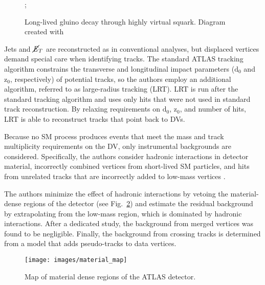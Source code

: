 \documentclass[12pt]{article}
\begin{document}
        \noindent \begin{figure}[htbp] \begin{center}
        ;
        \caption{Long-lived gluino decay through highly virtual squark. Diagram created with~\cite{tikz}}
        \label{displaced_process}
        \end{center} \end{figure}

        Jets and $\cancel{\it{E}}_{T}$ are reconstructed as in conventional analyses, but displaced vertices demand special care when identifying tracks. The standard ATLAS tracking algorithm constrains the transverse and longitudinal impact parameters ($\mathrm{d}_0$ and $\mathrm{z}_0$, respectively) of potential tracks, so the authors employ an additional algorithm, referred to as large-radius tracking (LRT). LRT is run after the standard tracking algorithm and uses only hits that were not used in standard track reconstruction. By relaxing requirements on $\mathrm{d}_0$, $\mathrm{z}_0$, and number of hits, LRT is able to reconstruct tracks that point back to DVs.
        
        Because no SM process produces events that meet the mass and track multiplicity requirements on the DV, only instrumental backgrounds are considered. Specifically, the authors consider hadronic interactions in detector material, incorrectly combined vertices from short-lived SM particles, and hits from unrelated tracks that are incorrectly added to low-mass vertices .

        The authors minimize the effect of hadronic interactions by vetoing the material-dense regions of the detector (see Fig.~\ref{material_map}) and estimate the residual background by extrapolating from the low-mass region, which is dominated by hadronic interactions. After a dedicated study, the background from merged vertices was found to be negligible. Finally, the background from crossing tracks is determined from a model that adds pseudo-tracks to data vertices.

        \noindent \begin{figure}[htbp] \begin{center}
        \texttt{[image: images/material\_map]}
            \caption{Map of material dense regions of the ATLAS detector.~\cite{atlas_displaced}}
        \label{material_map}
        \end{center} \end{figure}
\end{document}
